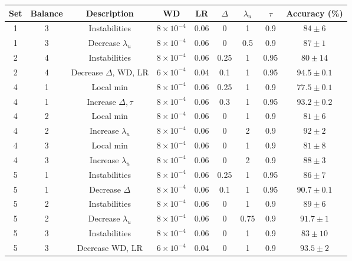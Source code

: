 \documentclass[final]{cvpr}
\newcommand{\HPs}{hyper-parameters }
\begin{document}
\begin{table*}
	\begin{center}
		\begin{tabular}{|c|c|c|c|c|c|c|c|c|}
			\hline
			Set  & Balance & Description & WD & LR & $ \Delta $ & $ \lambda_u $ & $ \tau $ & Accuracy (\%)    \\
			\hline\hline
			1 & 3  & Instabilities  & $ 8 \times 10^{-4} $ & 0.06 &  0  &  1 & 0.9   & $ 84 \pm 6  $   \\
			\hline
			1 & 3  & Decrease $ \lambda_u $  & $ 8 \times 10^{-4} $ & 0.06 &  0  & 0.5 & 0.9   & $ 87 \pm 1  $   \\
			\hline\hline
			2 & 4  & Instabilities  & $ 8 \times 10^{-4} $ & 0.06 &  0.25  &  1 & 0.95   & $ 80 \pm 14  $   \\
			\hline
			2 & 4  & Decrease $ \Delta$, WD, LR  & $ 6 \times 10^{-4} $ & 0.04 &  0.1  & 1 & 0.95   & $ 94.5 \pm 0.1  $   \\
			\hline\hline
			4 & 1  & Local min  & $ 8 \times 10^{-4} $ & 0.06 &  0.25  &  1 & 0.9   & $ 77.5 \pm 0.1  $   \\
			\hline
			4 & 1  & Increase $ \Delta, \tau $  & $ 8 \times 10^{-4} $ & 0.06 &  0.3  &  1 & 0.95   & $ 93.2 \pm 0.2  $   \\
			\hline\hline
			4 & 2  & Local min  & $ 8 \times 10^{-4} $ & 0.06 &  0  &  1 & 0.9   & $ 81 \pm 6  $   \\
			\hline
			4 & 2  & Increase $ \lambda_u $  & $ 8 \times 10^{-4} $ & 0.06 &  0  &  2 & 0.9   & $ 92 \pm 2  $   \\
			\hline\hline
			4 & 3  & Local min  & $ 8 \times 10^{-4} $ & 0.06 &  0  &  1 & 0.9   & $ 81 \pm 8  $   \\
			\hline
			4 & 3  & Increase $ \lambda_u $  & $ 8 \times 10^{-4} $ & 0.06 &  0  &  2 & 0.9   & $ 88 \pm 3  $   \\
			\hline\hline
			5 & 1  & Instabilities  & $ 8 \times 10^{-4} $ & 0.06 &  0.25  &  1 & 0.95   & $ 86 \pm 7  $   \\
			\hline
			5 & 1  & Decrease $ \Delta $  & $ 8 \times 10^{-4} $ & 0.06 &  0.1  &  1 & 0.95   & $ 90.7 \pm 0.1  $   \\
			\hline\hline
			5 & 2  & Instabilities  & $ 8 \times 10^{-4} $ & 0.06 &  0  &  1 & 0.9   & $ 89 \pm 6  $   \\
			\hline
			5 & 2  & Decrease $ \lambda_u $  & $ 8 \times 10^{-4} $ & 0.06 &  0  &  0.75 & 0.9   & $ 91.7 \pm 1  $   \\
			\hline\hline
			5 & 3  & Instabilities  & $ 8 \times 10^{-4} $ & 0.06 &  0  &  1 & 0.9   & $ 83 \pm 10  $   \\
			\hline
			5 & 3  & Decrease WD, LR  & $ 6 \times 10^{-4} $ & 0.04 &  0  &  1 & 0.9   & $ 93.5 \pm 2  $   \\
			\hline
		\end{tabular}
	\end{center}
	\caption{Illustration of the sensitivity to the \HPs WD, LR, $ \Delta$, $ \lambda_u $ and $ \tau $.  See the text for guidance on how to tune these hyper-parameters for situations with inferior performance due to instabilities or local minimums. 
	}
	\label{tab:tuneHP}
\end{table*}
\end{document}
